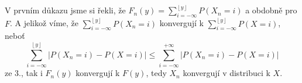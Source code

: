 \documentclass[12pt]{article}					%
\begin{document}
\begin{priklad}
	\begin{dukazin}[„3. $\implies$ 1.“]
		V prvním důkazu jsme si řekli, že $F_n(y) = \sum_{i = -∞}^{\left\lfloor y \right\rfloor} P(X_n = i)$ a obdobně pro $F$. A jelikož víme, že $\sum_{i = -∞}^{\left\lfloor y \right\rfloor} P(X_n = i)$ konvergují k $\sum_{i = -∞}^{\left\lfloor y \right\rfloor} P(X = i)$, neboť
		$$ \sum_{i=-∞}^{\left\lfloor y \right\rfloor} |P(X_n = i) - P(X = i)| ≤ \sum_{i=-∞}^{+∞} |P(X_n = i) - P(X = i)| $$
		ze 3., tak i $F_n(y)$ konvergují k $F(y)$, tedy $X_n$ konvergují v distribuci k $X$.
	\end{dukazin}
\end{priklad}
\end{document}
